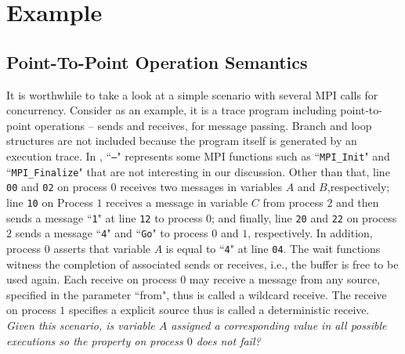 \section{Example}
\subsection{Point-To-Point Operation Semantics}
It is worthwhile to take a look at a simple scenario with several MPI calls for concurrency. Consider  as an example, it is a trace program including point-to-point operations -- sends and receives, for message passing. Branch and loop structures are not included because the program itself is generated by an execution trace.
In , ``\texttt{---}" represents some MPI functions such as ``\texttt{MPI\_Init}" and ``\texttt{MPI\_Finalize}" that are not interesting in our discussion. Other than that,  line \texttt{00} and \texttt{02} on process $0$ receives two messages in variables $A$ and $B$,respectively; line \texttt{10} on Process $1$ receives a message in variable $C$ from process $2$ and then sends a message ``\texttt{1}" at line \texttt{12} to process $0$; and finally, line \texttt{20} and \texttt{22} on process $2$ sends a message ``\texttt{4}" and ``\texttt{Go}" to process $0$ and $1$, respectively. In addition, process $0$ asserts that variable $A$ is equal to ``\texttt{4}" at line \texttt{04}. The wait functions witness the completion of associated sends or receives, i.e., the buffer is free to be used again. Each receive on process $0$ may receive a message from any source, specified in the parameter ``from", thus is called a wildcard receive. The receive on process $1$ specifies a explicit source thus is called a deterministic receive. \textit{Given this scenario, is variable $A$ assigned a corresponding value in all possible executions so the property on process $0$ does not fail?}

